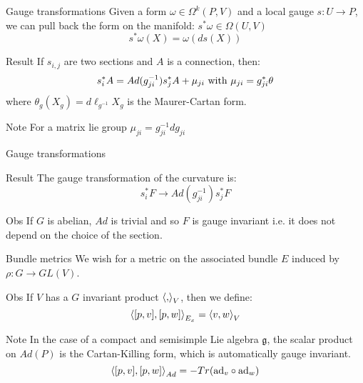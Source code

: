 \documentclass{beamer}
\begin{document}
\begin{frame}{Gauge transformations}
	Given a form $\omega\in\Omega^k(P,V)$ and a local gauge $s:U\rightarrow P$, we can pull back the form on the manifold: $s^*\omega \in\Omega(U,V)$
	$$s^*\omega(X)=\omega(ds(X))$$
	\begin{block}{Result}
		If $s_{i,j}$ are two sections and $A$ is a connection, then:
		$$s_i^*A=Ad(g_{ji}^{-1})s^*_jA+\mu_{ji} \hbox{ with } \mu_{ji}=g^*_{ji}\theta$$
		where $\theta_g(X_g)=d\ell_{g^{-1}}X_g$ is the Maurer-Cartan form.
	\end{block}
	\begin{alertblock}{Note}
		For a matrix lie group $\mu_{ji}=g_{ji}^{-1}dg_{ji}$
	\end{alertblock}
\end{frame}
\begin{frame}{Gauge transformations}
	\begin{block}{Result}
		The gauge transformation of the curvature is:
		$$s_i^*F\rightarrow Ad(g_{ji}^{-1})s_j^*F$$
	\end{block}
	\begin{exampleblock}{Obs}
		If $G$ is abelian, $Ad$ is trivial and so $F$ is gauge invariant i.e. it does not depend on the choice of the section.
	\end{exampleblock}
\end{frame}
\begin{comment}
	\begin{frame}{Gauge transformations}
		One can look at gauge transformations on the associated bundle:
		\begin{alertblock}{Prop}
			$$\mathcal{G}(P)\times E\rightarrow E$$
			$$(f,[p,v])\rightarrow [f(p),v]$$
		\end{alertblock}
		Recall that there is an associated form $F_M\in\Omega^2(M,Ad(P))$.
		\begin{block}{Result}
			Under a gauge transformation $F_M\rightarrow \phi^{-1}\cdot F_M$.
		\end{block}
	\end{frame}
\end{comment}
\begin{frame}{Bundle metrics}
	We wish for a metric on the associated bundle $E$ induced by $\rho:G\rightarrow GL(V)$.
	\begin{exampleblock}{Obs}
		If $V$ has a $G$ invariant product $\braket{,}_V$, then we define:
		$$\braket{[p,v],[p,w]}_{E_x}=\braket{v,w}_V$$
	\end{exampleblock}
	\begin{alertblock}{Note}
		In the case of a compact and semisimple Lie algebra $\mathfrak{g}$, the scalar product on $Ad(P)$ is the Cartan-Killing form, which is automatically gauge invariant.
		$$\braket{[p,v],[p,w]}_{Ad}=-Tr(\hbox{ad}_v\circ \hbox{ad}_w)$$
	\end{alertblock}
\end{frame}
\end{document}
